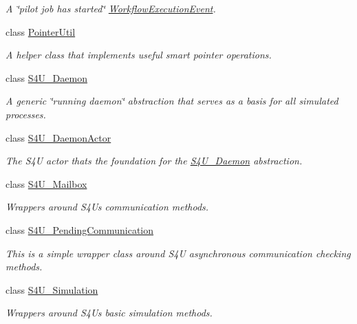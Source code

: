 \begin{DoxyCompactItemize}
\begin{DoxyCompactList}\small\item\em A \char`\"{}pilot job has started\char`\"{} \hyperlink{classwrench_1_1_workflow_execution_event}{Workflow\+Execution\+Event}. \end{DoxyCompactList}\item 
class \hyperlink{classwrench_1_1_pointer_util}{Pointer\+Util}
\begin{DoxyCompactList}\small\item\em A helper class that implements useful smart pointer operations. \end{DoxyCompactList}\item 
class \hyperlink{classwrench_1_1_s4_u___daemon}{S4\+U\+\_\+\+Daemon}
\begin{DoxyCompactList}\small\item\em A generic \char`\"{}running daemon\char`\"{} abstraction that serves as a basis for all simulated processes. \end{DoxyCompactList}\item 
class \hyperlink{classwrench_1_1_s4_u___daemon_actor}{S4\+U\+\_\+\+Daemon\+Actor}
\begin{DoxyCompactList}\small\item\em The S4U actor that\textquotesingle{}s the foundation for the \hyperlink{classwrench_1_1_s4_u___daemon}{S4\+U\+\_\+\+Daemon} abstraction. \end{DoxyCompactList}\item 
class \hyperlink{classwrench_1_1_s4_u___mailbox}{S4\+U\+\_\+\+Mailbox}
\begin{DoxyCompactList}\small\item\em Wrappers around S4U\textquotesingle{}s communication methods. \end{DoxyCompactList}\item 
class \hyperlink{classwrench_1_1_s4_u___pending_communication}{S4\+U\+\_\+\+Pending\+Communication}
\begin{DoxyCompactList}\small\item\em This is a simple wrapper class around S4U asynchronous communication checking methods. \end{DoxyCompactList}\item 
class \hyperlink{classwrench_1_1_s4_u___simulation}{S4\+U\+\_\+\+Simulation}
\begin{DoxyCompactList}\small\item\em Wrappers around S4U\textquotesingle{}s basic simulation methods. \end{DoxyCompactList}\item 

\end{DoxyCompactItemize}

